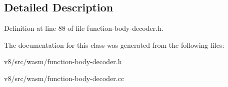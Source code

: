 \subsection{Detailed Description}


Definition at line 88 of file function-\/body-\/decoder.\+h.



The documentation for this class was generated from the following files\+:\begin{DoxyCompactItemize}
\item 
v8/src/wasm/function-\/body-\/decoder.\+h\item 
v8/src/wasm/function-\/body-\/decoder.\+cc\end{DoxyCompactItemize}

